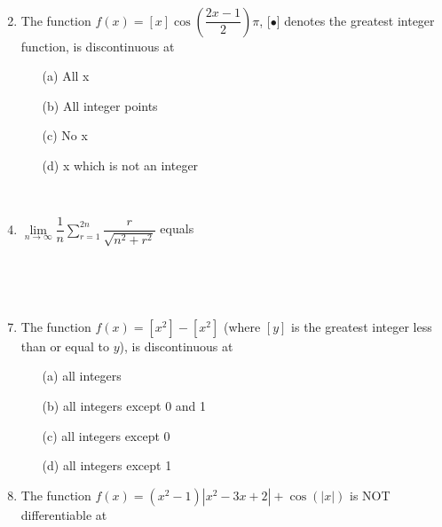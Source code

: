 \documentclass[journal,12pt,twocolumn]{IEEEtran}
\begin{document}
\begin{enumerate}
\item[~] \item The function $f(x)=[x]\cos\left(\dfrac{2x-1}{2}\right)\pi$, [$\bullet$] denotes the greatest integer function, is discontinuous at
\begin{itemize}
\item[(a)] All x \item[(b)] All integer points \item[(c)] No x \item[(d)] x which is not an integer
\end{itemize}

\item[~] \item $\lim\limits_{n \to \infty}\dfrac{1}{n}\sum\limits_{r=1}^{2n}\dfrac{r}{\sqrt{n^2+r^2}}$ equals \item[~] \item[~]
\begin{itemize}
\end{itemize} 

\item The function $f(x)\mathbin{=}[x^2]-[x^2]$ (where $[y]$ is the greatest integer less than or equal to $y$), is discontinuous at
\begin{itemize}
\item[(a)] all integers
\item[(b)] all integers except 0 and 1
\item[(c)] all integers except 0
\item[(d)] all integers except 1
\end{itemize}

\item The function $f(x)\mathbin{=}\left(x^2-1\right)|x^2-3x+2|+\cos\left(|x|\right)$ is NOT differentiable at
\begin{itemize}
\end{itemize}


\end{enumerate}
\end{document}
